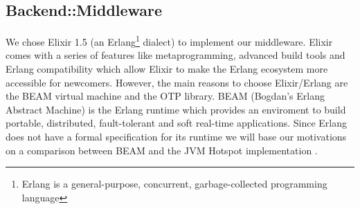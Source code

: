 \subsection{Backend::Middleware}
We chose Elixir 1.5 (an Erlang\footnote{Erlang is a general-purpose, concurrent, garbage-collected programming language} dialect) to implement
our middleware. Elixir comes with a series of features like metaprogramming,
advanced build tools and Erlang compatibility which allow Elixir to make the
Erlang ecosystem more accessible for newcomers.
However, the main reasons to choose Elixir/Erlang are the BEAM virtual machine
and the OTP library.
BEAM (Bogdan's Erlang Abstract Machine) is the Erlang runtime which provides an
enviroment to build portable, distributed, fault-tolerant and soft real-time
applications.
Since Erlang does not have a formal specification for its runtime we will
base our motivations on a comparison between BEAM and the JVM Hotspot
implementation \cite{poolcomparison}.

